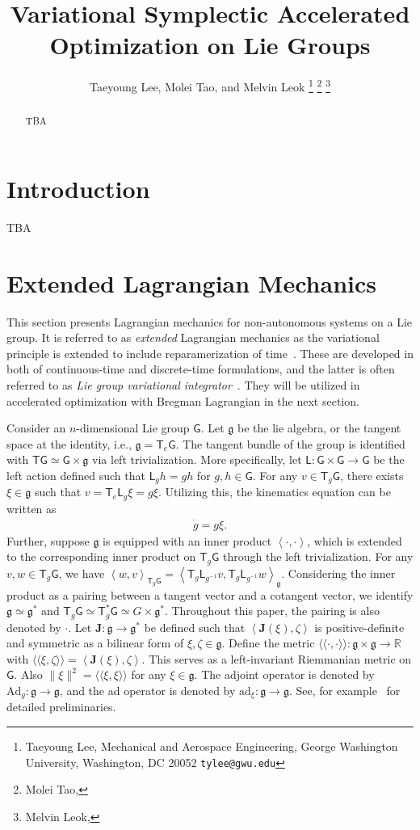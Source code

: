 \documentclass[letterpaper, 10pt, conference]{ieeeconf}
\title{\LARGE \bf Variational Symplectic Accelerated Optimization on Lie Groups}
\author{%
    Taeyoung Lee, Molei Tao, and Melvin Leok%
    \thanks{Taeyoung Lee, Mechanical and Aerospace Engineering, George Washington University, Washington, DC 20052 {\tt tylee@gwu.edu}}%
    \thanks{Molei Tao, }
    \thanks{Melvin Leok, }
}
\newcommand{\G}{\ensuremath{\mathsf{G}}}
\newcommand{\T}{\ensuremath{\mathsf{T}}}
\renewcommand{\L}{\ensuremath{\mathsf{L}}}
\renewcommand{\Re}{\ensuremath{\mathbb{R}}}
\newcommand{\pair}[1]{\ensuremath{\left\langle #1 \right\rangle}}
\newcommand{\met}[1]{\ensuremath{\langle\!\langle #1 \rangle\!\rangle}}
\newcommand{\Ad}{\ensuremath{\mathrm{Ad}}}
\newcommand{\ad}{\ensuremath{\mathrm{ad}}}
\newcommand{\g}{\ensuremath{\mathfrak{g}}}
\begin{document}
\allowdisplaybreaks


\maketitle \thispagestyle{empty} \pagestyle{empty}

\begin{abstract}
    TBA
\end{abstract}

\section{Introduction}
TBA


\section{Extended Lagrangian Mechanics}

This section presents Lagrangian mechanics for non-autonomous systems on a Lie group. 
It is referred to as \textit{extended} Lagrangian mechanics as the variational principle is extended to include reparamerization of time~\cite{MarWesAN01}.
These are developed in both of continuous-time and discrete-time formulations, and the latter is often referred to as \textit{Lie group variational integrator}~\cite{LeeLeoCMAME07}.
They will be utilized in accelerated optimization with Bregman Lagrangian in the next section.

Consider  an $n$-dimensional Lie group $\G$.
Let $\g$ be the lie algebra, or the tangent space at the identity, i.e., $\g = \T_e\G$.
The tangent bundle of the group is identified with $\T\G \simeq \G\times \g$ via left trivialization.
More specifically, let $\L:\G\times\G\rightarrow\G$ be the left action defined such that $\L_g h = gh$ for $g,h\in\G$.
For any $v\in\T_g\G$, there exists $\xi\in\g$ such that $v =\T_e\L_g \xi=g\xi$.
Utilizing this, the kinematics equation can be written as
\begin{align}
    \dot g = g\xi. \label{eqn:g_dot}
\end{align}
Further, suppose $\g$ is equipped with an inner product $\pair{\cdot, \cdot}$, which is extended to the corresponding inner product on $\T_g\G$ through the left trivialization.
For any $v,w\in\T_g\G$, we have $\pair{w,v}_{\T_g\G} = \pair{ \T_g \L_{g^{-1}} v, \T_g \L_{g^{-1}} w}_\g$. 
Considering the inner product as a pairing between a tangent vector and a cotangent vector, we identify $\g\simeq \g^*$ and $\T_g \G \simeq \T^*_g \G\simeq G\times \g^*$.
Throughout this paper, the pairing is also denoted by $\cdot$.
Let $\mathbf{J}:\g\rightarrow\g^*$ be defined such that $\pair{\mathbf{J}(\xi),\zeta}$ is positive-definite and symmetric as a bilinear form of $\xi,\zeta\in\g$.
Define the metric $\met{\cdot,\cdot}:\g\times\g\rightarrow\Re$ with $\met{\xi,\zeta} = \pair{\mathbf{J}(\xi),\zeta}$.
This serves as a left-invariant Riemmanian metric on $\G$.
Also $\|\xi\|^2 = \met{\xi,\xi}$ for any $\xi\in\g$.
The adjoint operator is denoted by $\Ad_g:\g\rightarrow\g$, and the ad operator is denoted by $\ad_\xi:\g\rightarrow\g$. See, for example~\cite{MarRat99} for detailed preliminaries. 
\end{document}
